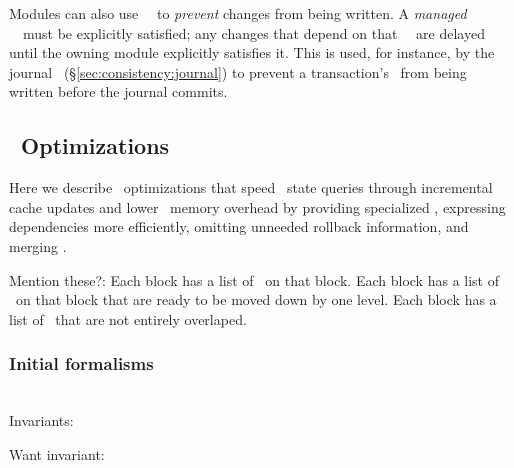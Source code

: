 Modules can also use \noop\ \chdescs\ to \emph{prevent} changes from being
written.
%
A \emph{managed} \noop\ \chdesc\ must be explicitly satisfied; any changes that
depend on that \noop\ \chdesc\ are delayed until the owning module explicitly
satisfies it.
%
This is used, for instance, by the journal \module\
(\S\ref{sec:consistency:journal}) to prevent a transaction's \chdescs\
from being written before the journal commits.

\subsection{\ChDesc\ Optimizations}
\label{sec:chdescs:optimizations}

Here we describe \chdesc\ optimizations that speed \chdesc\ state
queries through incremental cache updates
%
and lower \chdesc\ memory overhead by
%
providing specialized \chdescs,
%
expressing dependencies more efficiently,
%
omitting unneeded rollback information,
%
and merging \chdescs.

Mention these?:
%
Each block has a list of \chdescs\ on that block.
%
Each block has a list of \chdescs\ on that block that are ready to be
moved down by one level.
%
Each block has a list of \chdescs\ that are not entirely overlaped.

\subsubsection{Initial formalisms}

\noindent\\ Invariants:

\cdinvar{b}{If \(\indirdepends{a}{b} \land \inset{a}{\psetinflight{t}}\)
then \(\inset{b}{\psetsat{t}} \lor (\inset{b}{\psetinflight{t}}
\land \blockof{a} = \blockof{b})\).}

\noindent Want invariant:


